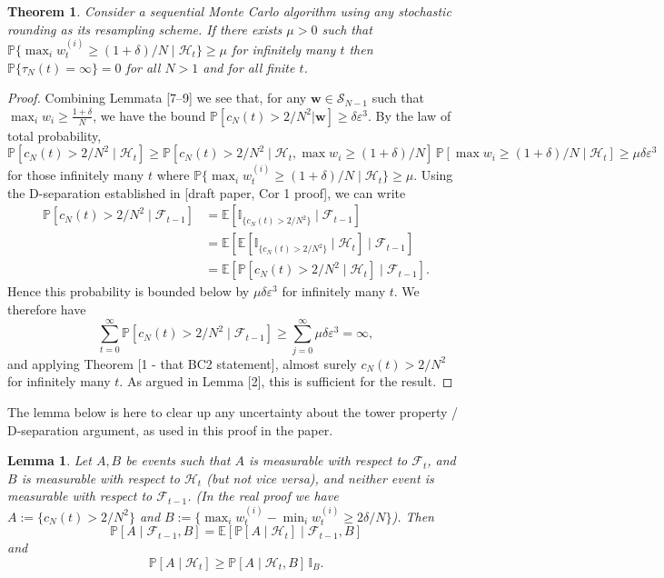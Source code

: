 \documentclass{article}
\newtheorem{thm}{Theorem}
\newtheorem{lemma}{Lemma}
\newcommand{\PR}{\mathbb{P}}
\newcommand{\E}{\mathbb{E}}
\newcommand{\I}[1]{\mathbb{I}_{\{#1\}}}
\newcommand{\1}[1]{\mathbb{I}_{#1}}
\begin{document}
\begin{thm}
Consider a sequential Monte Carlo algorithm using any stochastic rounding as its resampling scheme.
If there exists $\mu>0$ such that $\PR\{\max_i w_t^{(i)} \geq (1+\delta)/N \mid \mathcal{H}_t\} \geq \mu$ for infinitely many $t$ then $\PR\{\tau_N(t) = \infty \}=0$ for all $N>1$ and for all finite $t$.
\end{thm}

\begin{proof}
Combining Lemmata [7--9] we see that, for any $\mathbf{w} \in \mathcal{S}_{N-1}$ such that $\max_i w_i \geq \frac{1 + \delta}{N}$, we have the bound $\PR[ c_N(t) > 2/N^2 | \mathbf{w} ] \geq \delta\varepsilon^3$.
By the law of total probability,
\begin{equation*}
\PR[c_N(t) > 2/N^2 \mid \mathcal{H}_t] 
\geq \PR[c_N(t) > 2/N^2 \mid \mathcal{H}_t, \max w_i \geq (1+\delta)/N ]\, \PR[\max w_i \geq (1+\delta)/N \mid \mathcal{H}_t]
\geq \mu \delta \varepsilon^3 
\end{equation*}
for those infinitely many $t$ where $\PR\{\max_i w_t^{(i)} \geq (1+\delta)/N \mid \mathcal{H}_t\} \geq \mu$.
Using the D-separation established in [draft paper, Cor 1 proof], we can write
\begin{align*}
\PR[c_N(t) > 2/N^2 \mid \mathcal{F}_{t-1}] 
&= \E[ \I{c_N(t) > 2/N^2} \mid \mathcal{F}_{t-1}] \\
&= \E[ \E[ \I{c_N(t) > 2/N^2} \mid \mathcal{H}_t ]\mid \mathcal{F}_{t-1}] \\
&= \E[ \PR[c_N(t) > 2/N^2 \mid \mathcal{H}_t ]\mid \mathcal{F}_{t-1}] .
\end{align*}
Hence this probability is bounded below by $\mu\delta\varepsilon^3$ for infinitely many $t$. We therefore have
\begin{equation}
\sum_{t=0}^\infty \PR[c_N(t) > 2/N^2 \mid \mathcal{F}_{t-1}]  \geq \sum_{j=0}^\infty \mu\delta\varepsilon^3 = \infty ,
\end{equation}
and applying Theorem [1 - that BC2 statement], almost surely $c_N(t) >2/N^2$ for infinitely many $t$.
As argued in Lemma [2], this is sufficient for the result.
\end{proof}

The lemma below is here to clear up any uncertainty about the tower property / D-separation argument, as used in this proof in the paper.
\begin{lemma}
Let $A,B$ be events such that $A$ is measurable with respect to $\mathcal{F}_{t}$, and $B$ is measurable with respect to $\mathcal{H}_{t}$ (but not vice versa), and neither event is measurable with respect to $\mathcal{F}_{t-1}$. 
(In the real proof we have $A:= \{c_N(t)>2/N^2\}$ and $B:= \{ \max_i w_t^{(i)} - \min_i w_t^{(i)} \geq 2\delta/N \}$).
Then
\begin{equation}
\PR[A \mid \mathcal{F}_{t-1}, B] 
=\E[ \PR[ A \mid \mathcal{H}_t] \mid \mathcal{F}_{t-1}, B ] 
\end{equation}
and
\begin{equation}
\PR[A \mid \mathcal{H}_t] 
\geq \PR[ A \mid \mathcal{H}_t, B] \, \1{B}.
\end{equation}
\end{lemma}
\end{document}
